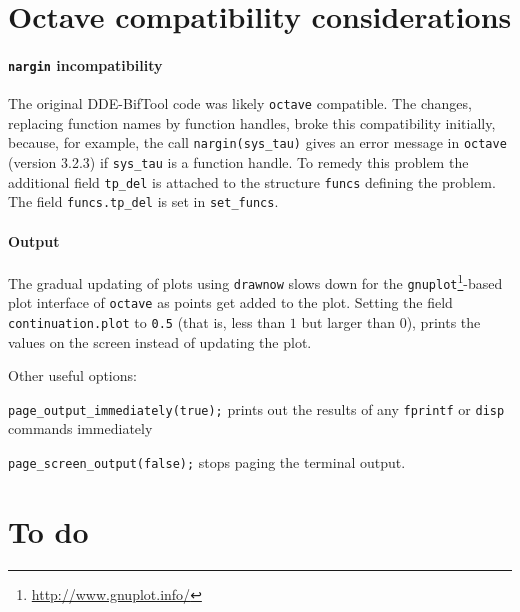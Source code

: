 \documentclass[11pt]{scrartcl}
\newcommand{\blist}[1]{\mbox{\lstinline!#1!}}  \newlength{\tabw}
\begin{document}
\section{Octave compatibility considerations}
\label{sec:octave}

\paragraph{\blist{nargin} incompatibility}
The original DDE-BifTool code was likely
\texttt{octave}
compatible. The changes, replacing function names by function handles,
broke this compatibility initially, because, for example, the call
\blist{nargin(sys_tau)} gives an error message in \texttt{octave}
(version 3.2.3) if \blist{sys_tau} is a function handle. To remedy
this problem the additional field \blist{tp_del} is attached to the
structure \blist{funcs} defining the problem. The field
\blist{funcs.tp_del} is set in \blist{set_funcs}.

\paragraph{Output}
The gradual updating of plots using \blist{drawnow} slows down for the
\texttt{gnuplot}\footnote{\url{http://www.gnuplot.info/}}-based plot
interface of \texttt{octave} as points get added to the plot. Setting
the field \blist{continuation.plot} to \blist{0.5} (that is, less than
$1$ but larger than $0$), prints the values on the screen instead of
updating the plot.

Other useful options:
\begin{compactitem}
\item \blist{page_output_immediately(true);} prints out the results of any
  \blist{fprintf} or \blist{disp} commands immediately
\item \blist{page_screen_output(false);} stops paging the terminal output.
\end{compactitem}

\section{To do}
\label{sec:todo}
\end{document}
